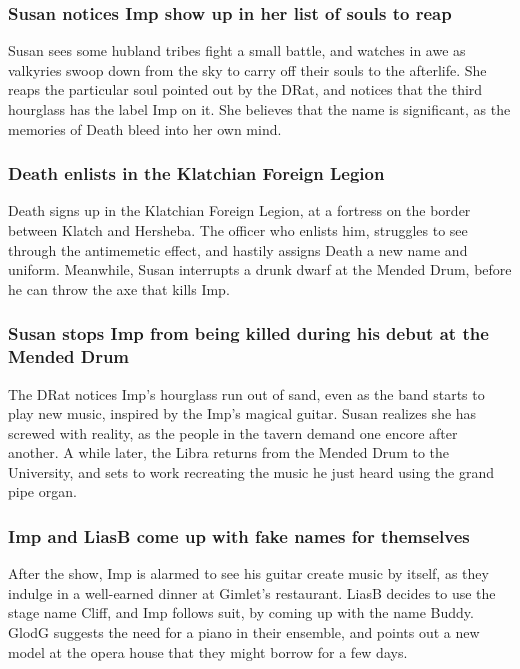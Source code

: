 \subsubsection{\Gls{Susan} notices \Gls{Imp} show up in her list of souls to reap}
\Gls{Susan} sees some hubland tribes fight a small battle, and watches in awe as valkyries swoop
down from the sky to carry off their souls to the afterlife. She reaps the particular soul pointed
out by the \Gls{DRat}, and notices that the third hourglass has the label \Gls{Imp} on it. She
believes that the name is significant, as the memories of \Gls{Death} bleed into her own mind.

\subsubsection{\Gls{Death} enlists in the Klatchian Foreign Legion}
\Gls{Death} signs up in the Klatchian Foreign Legion, at a fortress on the border between Klatch
and Hersheba. The officer who enlists him, struggles to see through the antimemetic effect, and
hastily assigns \Gls{Death} a new name and uniform. Meanwhile, \Gls{Susan} interrupts a drunk dwarf
at the Mended Drum, before he can throw the axe that kills \Gls{Imp}.

\subsubsection{\Gls{Susan} stops \Gls{Imp} from being killed during his debut at the Mended Drum}
The \Gls{DRat} notices \Gls{Imp}'s hourglass run out of sand, even as the band starts to play new
music, inspired by the \Gls{Imp}'s magical guitar. \Gls{Susan} realizes she has screwed with
reality, as the people in the tavern demand one encore after another. A while later, the \Gls{Libra}
returns from the Mended Drum to the University, and sets to work recreating the music he just heard
using the grand pipe organ.

\subsubsection{\Gls{Imp} and \Gls{LiasB} come up with fake names for themselves}
After the show, \Gls{Imp} is alarmed to see his guitar create music by itself, as they indulge in
a well-earned dinner at \Gls{Gimlet}'s restaurant. \Gls{LiasB} decides to use the stage name
\Gls{Cliff}, and \Gls{Imp} follows suit, by coming up with the name \Gls{Buddy}. \Gls{GlodG}
suggests the need for a piano in their ensemble, and points out a new model at the opera house that
they might borrow for a few days.

